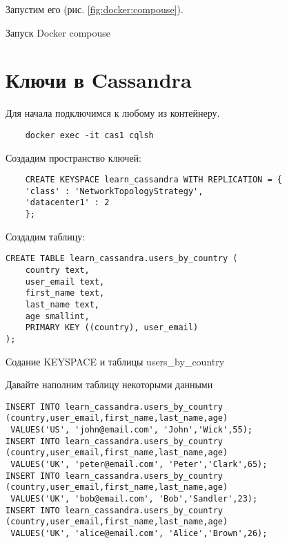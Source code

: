 

Запустим его (рис. \ref{fig:docker:compouse}).

\begin{image}
	\caption{Запуск Docker compouse}
	\label{fig:docker:compouse}
\end{image}

\section{Ключи в Cassandra}

Для начала подключимся к любому из контейнеру.

\begin{verbatim}
	docker exec -it cas1 cqlsh
\end{verbatim}

Создадим пространство ключей:

\begin{verbatim}
	CREATE KEYSPACE learn_cassandra WITH REPLICATION = {
	'class' : 'NetworkTopologyStrategy',
	'datacenter1' : 2
	};
\end{verbatim}

Создадим таблицу:

\begin{verbatim}
CREATE TABLE learn_cassandra.users_by_country (
	country text,
	user_email text,
	first_name text,
	last_name text,
	age smallint,
	PRIMARY KEY ((country), user_email)
);
\end{verbatim}

\begin{image}
	\caption{Содание KEYSPACE и таблицы users\_by\_country}
	\label{fig:keyspace}
\end{image}

Давайте наполним таблицу некоторыми данными

\begin{verbatim}
INSERT INTO learn_cassandra.users_by_country
(country,user_email,first_name,last_name,age)
 VALUES('US', 'john@email.com', 'John','Wick',55);
INSERT INTO learn_cassandra.users_by_country
(country,user_email,first_name,last_name,age)
 VALUES('UK', 'peter@email.com', 'Peter','Clark',65);
INSERT INTO learn_cassandra.users_by_country
(country,user_email,first_name,last_name,age)
 VALUES('UK', 'bob@email.com', 'Bob','Sandler',23);
INSERT INTO learn_cassandra.users_by_country
(country,user_email,first_name,last_name,age)
 VALUES('UK', 'alice@email.com', 'Alice','Brown',26);
\end{verbatim}

